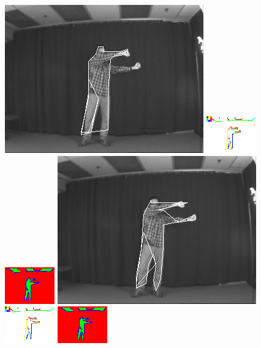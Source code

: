 \documentclass{tufte-book}
\begin{document}
\begin{figure}
\includegraphics[width=0.3 \linewidth]{output/2.detection/image_parsing/out.14.d/thefinalparse.png}
\includegraphics[width=0.3 \linewidth]{output/2.detection/image_parsing/out.14.d/local.x5.orientations.png}
\includegraphics[width=0.3 \linewidth]{output/2.detection/image_parsing/out.14.d/local.x5.interior.png}
\includegraphics[width=0.3 \linewidth]{output/2.detection/image_parsing/out.15.d/thefinalparse.png}
\includegraphics[width=0.3 \linewidth]{output/2.detection/image_parsing/out.15.d/local.x5.orientations.png}
\includegraphics[width=0.3 \linewidth]{output/2.detection/image_parsing/out.15.d/local.x5.interior.png}
\end{figure}
\end{document}
